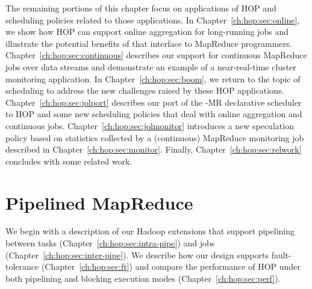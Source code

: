 The remaining portions of this chapter focus on applications of HOP and
scheduling policies related to those applications.  In
Chapter~\ref{ch:hop:sec:online}, we show how HOP can support online aggregation
for long-running jobs and illustrate the potential benefits of that interface
to MapReduce programmers.  Chapter~\ref{ch:hop:sec:continuous} describes our
support for continuous MapReduce jobs over data streams and demonstrate an
example of a near-real-time cluster monitoring application.  In
Chapter~\ref{ch:hop:sec:boom}, we return to the topic of scheduling to address
the new challenges raised by these HOP applications.
Chapter~\ref{ch:hop:sec:jolport} describes our port of the \BOOM-MR declarative
scheduler to HOP and some new \OVERLOG scheduling policies that deal with
online aggregation and continuous jobs.  Chapter~\ref{ch:hop:sec:jolmonitor}
introduces a new speculation policy based on statistics collected by a
(continuous) MapReduce monitoring job described in
Chapter~\ref{ch:hop:sec:monitor}.  Finally, Chapter~\ref{ch:hop:sec:relwork}
concludes with some related work.

\section{Pipelined MapReduce}
\label{ch:hop:sec:pipelining}

We begin with a description of our Hadoop extensions that support pipelining
between tasks (Chapter~\ref{ch:hop:sec:intra-pipe}) and jobs
(Chapter~\ref{ch:hop:sec:inter-pipe}).  We describe how our design supports
fault-tolerance (Chapter~\ref{ch:hop:sec:ft}) and compare the performance of HOP
under both pipelining and blocking execution modes
(Chapter~\ref{ch:hop:sec:perf}).


